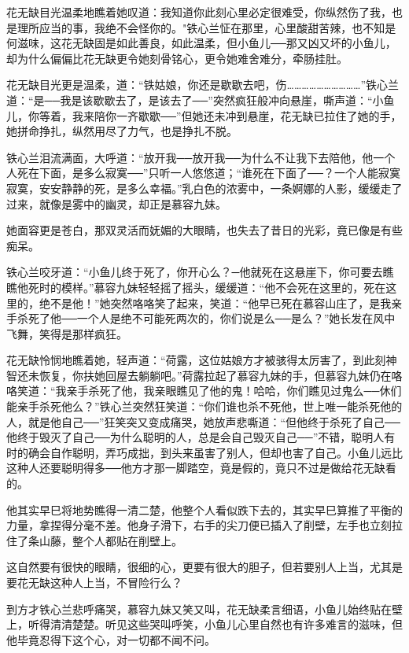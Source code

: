 \documentclass[12pt,oneside]{book}
\begin{document}
花无缺目光温柔地瞧着她叹道：我知道你此刻心里必定很难受，你纵然伤了我，也是理所应当的事，我绝不会怪你的。"铁心兰怔在那里，心里酸甜苦辣，也不知是何滋味，这花无缺固是如此善良，如此温柔，但小鱼儿──那又凶又坏的小鱼儿，却为什么偏偏比花无缺更令她刻骨铭心，更令她难舍难分，牵肠挂肚。

花无缺目光更是温柔，道：``铁姑娘，你还是歇歇去吧，伤\ldots\ldots\ldots\ldots\ldots\ldots\ldots\ldots\ldots\ldots{}''铁心兰道：``是──我是该歇歇去了，是该去了──''突然疯狂般冲向悬崖，嘶声道：``小鱼儿，你等着，我来陪你一齐歇歇──''但她还未冲到悬崖，花无缺已拉住了她的手，她拼命挣扎，纵然用尽了力气，也是挣扎不脱。

铁心兰泪流满面，大呼道：``放开我──放开我──为什么不让我下去陪他，他一个人死在下面，是多么寂寞──''只听一人悠悠道；``谁死在下面了──？一个人能寂寞寂寞，安安静静的死，是多么幸福。''乳白色的浓雾中，一条婀娜的人影，缓缓走了过来，就像是雾中的幽灵，却正是慕容九妹。

她面容更是苍白，那双灵活而妩媚的大眼睛，也失去了昔日的光彩，竟已像是有些痴呆。

铁心兰咬牙道：``小鱼儿终于死了，你开心么？─他就死在这悬崖下，你可要去瞧瞧他死时的模样。''慕容九妹轻轻摇了摇头，缓缓道：``他不会死在这里的，死在这里的，绝不是他！''她突然咯咯笑了起来，笑道：``他早已死在慕容山庄了，是我亲手杀死了他──一个人是绝不可能死两次的，你们说是么──是么？''她长发在风中飞舞，笑得是那样疯狂。

花无缺怜悯地瞧着她，轻声道：``荷露，这位姑娘方才被骇得太厉害了，到此刻神智还未恢复，你扶她回屋去躺躺吧。''荷露拉起了慕容九妹的手，但慕容九妹仍在咯咯笑道：``我亲手杀死了他，我亲眼瞧见了他的鬼！哈哈，你们瞧见过鬼么──休们能亲手杀死他么？''铁心兰突然狂笑道：``你们谁也杀不死他，世上唯一能杀死他的人，就是他自己──''狂笑突又变成痛哭，她放声悲嘶道：``但他终于杀死了自己──他终于毁灭了自己──为什么聪明的人，总是会自己毁灭自己──''不错，聪明人有时的确会自作聪明，弄巧成拙，到头来虽害了别人，但却也害了自己。小鱼儿远比这种人还要聪明得多──他方才那一脚踏空，竟是假的，竟只不过是做给花无缺看的。

他其实早巳将地势瞧得一清二楚，他整个人看似跌下去的，其实早巳算推了平衡的力量，拿捏得分毫不差。他身子滑下，右手的尖刀便已插入了削壁，左手也立刻拉住了条山藤，整个人都贴在削壁上。

这自然要有很快的眼睛，很细的心，更要有很大的胆子，但若要别人上当，尤其是要花无缺这种人上当，不冒险行么？

到方才铁心兰悲呼痛哭，慕容九妹又笑又叫，花无缺柔言细语，小鱼儿始终贴在壁上，听得清清楚楚。听见这些哭叫呼笑，小鱼儿心里自然也有许多难言的滋味，但他毕竟忍得下这个心，对一切都不闻不问。
\end{document}
